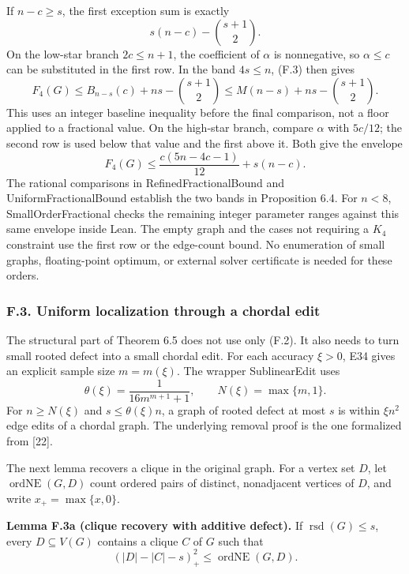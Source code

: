 \documentclass[english,11pt,a4paper]{article}
\begin{document}
If \(n-c\ge s\), the first exception sum is exactly \[
s(n-c)-\binom{s+1}{2}.
\tag{F.3}
\] On the low-star branch \(2c\le n+1\), the coefficient of \(\alpha\) is nonnegative, so \(\alpha\le c\) can be substituted in the first row. In the band \(4s\le n\), (F.3) then gives \[
F_4(G)\le B_{n-s}(c)+ns-\binom{s+1}{2}
\le M(n-s)+ns-\binom{s+1}{2}.
\] This uses an integer baseline inequality before the final comparison, not a floor applied to a fractional value. On the high-star branch, compare \(\alpha\) with \(5c/12\); the second row is used below that value and the first above it. Both give the envelope \[
F_4(G)\le\frac{c(5n-4c-1)}{12}+s(n-c).
\tag{F.4}
\] The rational comparisons in {\ttfamily\small RefinedFract\discretionary{\hbox{\ensuremath{\hookrightarrow}}}{}{}ionalBound} and {\ttfamily\small UniformFract\discretionary{\hbox{\ensuremath{\hookrightarrow}}}{}{}ionalBound} establish the two bands in Proposition 6.4. For \(n<8\), {\ttfamily\small SmallOrderFr\discretionary{\hbox{\ensuremath{\hookrightarrow}}}{}{}actional} checks the remaining integer parameter ranges against this same envelope inside Lean. The empty graph and the cases not requiring a \(K_4\) constraint use the first row or the edge-count bound. No enumeration of small graphs, floating-point optimum, or external solver certificate is needed for these orders.

\subsubsection{F.3. Uniform localization through a chordal edit}\label{f.3.-uniform-localization-through-a-chordal-edit}

The structural part of Theorem 6.5 does not use only (F.2). It also needs to turn small rooted defect into a small chordal edit. For each accuracy \(\xi>0\), E34 gives an explicit sample size \(m=m(\xi)\). The wrapper {\ttfamily\small SublinearEdi\discretionary{\hbox{\ensuremath{\hookrightarrow}}}{}{}t} uses \[
\theta(\xi)=\frac1{16m^{m+1}+1},\qquad N(\xi)=\max\{m,1\}.
\tag{F.5}
\] For \(n\ge N(\xi)\) and \(s\le\theta(\xi)n\), a graph of rooted defect at most \(s\) is within \(\xi n^2\) edge edits of a chordal graph. The underlying removal proof is the one formalized from {[}22{]}.

The next lemma recovers a clique in the original graph. For a vertex set \(D\), let \(\operatorname{ordNE}(G,D)\) count ordered pairs of distinct, nonadjacent vertices of \(D\), and write \(x_+=\max\{x,0\}\).

\textbf{Lemma F.3a (clique recovery with additive defect).} If \(\operatorname{rsd}(G)\le s\), every \(D\subseteq V(G)\) contains a clique \(C\) of \(G\) such that \[
(|D|-|C|-s)_+^2\le\operatorname{ordNE}(G,D).
\tag{F.5a}
\]
\end{document}
